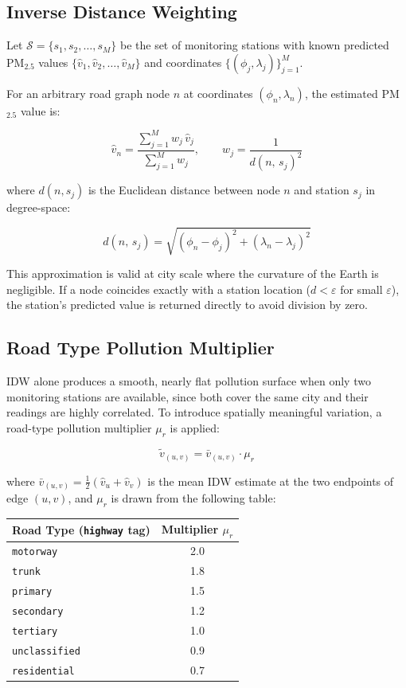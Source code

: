 \documentclass[12pt,a4paper]{article}
\begin{document}
\subsection{Inverse Distance Weighting}

Let $\mathcal{S} = \{s_1, s_2, \ldots, s_M\}$ be the set of monitoring stations with known predicted PM$_{2.5}$ values $\{\hat{v}_1, \hat{v}_2, \ldots, \hat{v}_M\}$ and coordinates $\{(\phi_j, \lambda_j)\}_{j=1}^{M}$.

For an arbitrary road graph node $n$ at coordinates $(\phi_n, \lambda_n)$, the estimated PM$_{2.5}$ value is:

\[
  \hat{v}_n = \frac{\displaystyle\sum_{j=1}^{M} w_j \,\hat{v}_j}{\displaystyle\sum_{j=1}^{M} w_j}, \qquad
  w_j = \frac{1}{d(n,\, s_j)^2}
\]

where $d(n, s_j)$ is the Euclidean distance between node $n$ and station $s_j$ in degree-space:

\[
  d(n,\, s_j) = \sqrt{(\phi_n - \phi_j)^2 + (\lambda_n - \lambda_j)^2}
\]

This approximation is valid at city scale where the curvature of the Earth is negligible. If a node coincides exactly with a station location ($d < \varepsilon$ for small $\varepsilon$), the station's predicted value is returned directly to avoid division by zero.

\subsection{Road Type Pollution Multiplier}

IDW alone produces a smooth, nearly flat pollution surface when only two monitoring stations are available, since both cover the same city and their readings are highly correlated. To introduce spatially meaningful variation, a road-type pollution multiplier $\mu_r$ is applied:

\[
  \tilde{v}_{(u,v)} = \bar{v}_{(u,v)} \cdot \mu_r
\]

where $\bar{v}_{(u,v)} = \tfrac{1}{2}(\hat{v}_u + \hat{v}_v)$ is the mean IDW estimate at the two endpoints of edge $(u, v)$, and $\mu_r$ is drawn from the following table:

\begin{center}
  \begin{tabular}{lc}
    \toprule
    Road Type (\texttt{highway} tag) & Multiplier $\mu_r$ \\
    \midrule
    \texttt{motorway}      & 2.0 \\
    \texttt{trunk}         & 1.8 \\
    \texttt{primary}       & 1.5 \\
    \texttt{secondary}     & 1.2 \\
    \texttt{tertiary}      & 1.0 \\
    \texttt{unclassified}  & 0.9 \\
    \texttt{residential}   & 0.7 \\
    \bottomrule
  \end{tabular}
\end{center}
\end{document}
